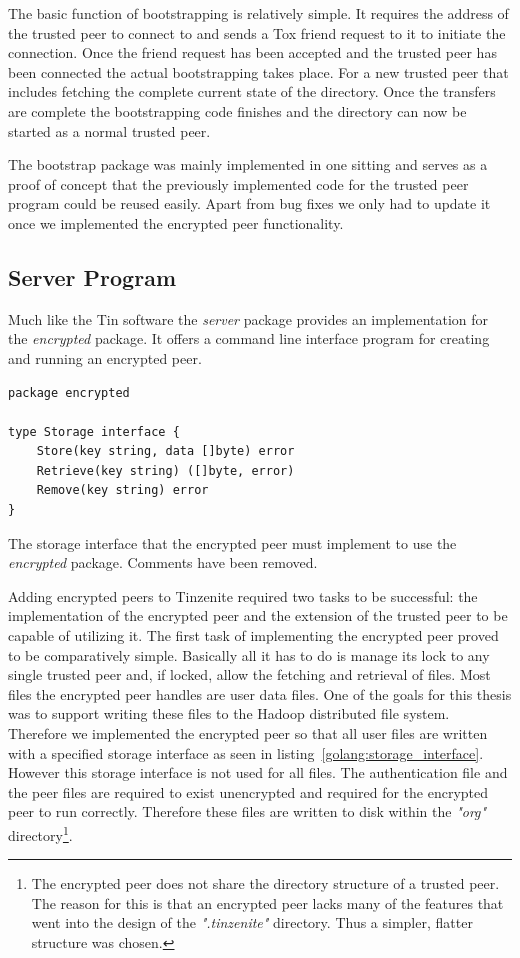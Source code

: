 The basic function of bootstrapping is relatively simple.
It requires the address of the trusted peer to connect to and sends a Tox friend request to it to initiate the connection.
Once the friend request has been accepted and the trusted peer has been connected the actual bootstrapping takes place.
For a new trusted peer that includes fetching the complete current state of the directory.
Once the transfers are complete the bootstrapping code finishes and the directory can now be started as a normal trusted peer.

The bootstrap package was mainly implemented in one sitting and serves as a proof of concept that the previously implemented code for the trusted peer program could be reused easily.
Apart from bug fixes we only had to update it once we implemented the encrypted peer functionality.

\subsection{Server Program}
\label{sub:Server Program}

Much like the Tin software the \emph{server} package provides an implementation for the \emph{encrypted} package.
It offers a command line interface program for creating and running an encrypted peer.

\begin{listing}[htp]
    \begin{lstlisting}[language=golang,firstnumber=0]
package encrypted

type Storage interface {
	Store(key string, data []byte) error
	Retrieve(key string) ([]byte, error)
	Remove(key string) error
}
    \end{lstlisting}
\caption[Encrypted Storage Interface]{The storage interface that the encrypted peer must implement to use the \emph{encrypted} package. Comments have been removed.}
\label{golang:storage_interface}
\end{listing}

Adding encrypted peers to Tinzenite required two tasks to be successful: the implementation of the encrypted peer and the extension of the trusted peer to be capable of utilizing it.
The first task of implementing the encrypted peer proved to be comparatively simple.
Basically all it has to do is manage its lock to any single trusted peer and, if locked, allow the fetching and retrieval of files.
Most files the encrypted peer handles are user data files.
One of the goals for this thesis was to support writing these files to the Hadoop distributed file system.
Therefore we implemented the encrypted peer so that all user files are written with a specified storage interface as seen in listing~\ref{golang:storage_interface}.
However this storage interface is not used for all files.
The authentication file and the peer files are required to exist unencrypted and required for the encrypted peer to run correctly.
Therefore these files are written to disk within the \textit{"org"} directory\footnote{The encrypted peer does not share the directory structure of a trusted peer. The reason for this is that an encrypted peer lacks many of the features that went into the design of the \textit{".tinzenite"} directory. Thus a simpler, flatter structure was chosen.}.


